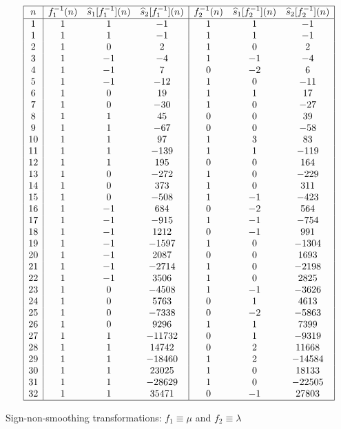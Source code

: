 \documentclass[12pt,reqno,a4letter]{article}
\numberwithin{figure}{section}
\numberwithin{table}{section}
\numberwithin{equation}{section}
\theoremstyle{plain}
\numberwithin{theorem}{section}
\theoremstyle{definition}
\begin{document}
\begin{table}[ht!]
\begin{equation*}
\begin{array}{|c|ccc|ccc|} 
 \hline
 n & f_1^{-1}(n) & \widehat{s}_1[f_1^{-1}](n) & \widehat{s}_2[f_1^{-1}](n) & 
     f_2^{-1}(n) & \widehat{s}_1[f_2^{-1}](n) & 
     \widehat{s}_2[f_2^{-1}](n) \\ \hline 1 & 1 & 1 & -1 & 1 & 1 & -1 \\
 1 & 1 & 1 & -1 & 1 & 1 & -1 \\
 2 & 1 & 0 & 2 & 1 & 0 & 2 \\
 3 & 1 & -1 & -4 & 1 & -1 & -4 \\
 4 & 1 & -1 & 7 & 0 & -2 & 6 \\
 5 & 1 & -1 & -12 & 1 & 0 & -11 \\
 6 & 1 & 0 & 19 & 1 & 1 & 17 \\
 7 & 1 & 0 & -30 & 1 & 0 & -27 \\
 8 & 1 & 1 & 45 & 0 & 0 & 39 \\
 9 & 1 & 1 & -67 & 0 & 0 & -58 \\
 10 & 1 & 1 & 97 & 1 & 3 & 83 \\
 11 & 1 & 1 & -139 & 1 & 1 & -119 \\
 12 & 1 & 1 & 195 & 0 & 0 & 164 \\
 13 & 1 & 0 & -272 & 1 & 0 & -229 \\
 14 & 1 & 0 & 373 & 1 & 0 & 311 \\
 15 & 1 & 0 & -508 & 1 & -1 & -423 \\
 16 & 1 & -1 & 684 & 0 & -2 & 564 \\
 17 & 1 & -1 & -915 & 1 & -1 & -754 \\
 18 & 1 & -1 & 1212 & 0 & -1 & 991 \\
 19 & 1 & -1 & -1597 & 1 & 0 & -1304 \\
 20 & 1 & -1 & 2087 & 0 & 0 & 1693 \\
 21 & 1 & -1 & -2714 & 1 & 0 & -2198 \\
 22 & 1 & -1 & 3506 & 1 & 0 & 2825 \\
 23 & 1 & 0 & -4508 & 1 & -1 & -3626 \\
 24 & 1 & 0 & 5763 & 0 & 1 & 4613 \\
 25 & 1 & 0 & -7338 & 0 & -2 & -5863 \\
 26 & 1 & 0 & 9296 & 1 & 1 & 7399 \\
 27 & 1 & 1 & -11732 & 0 & 1 & -9319 \\
 28 & 1 & 1 & 14742 & 0 & 2 & 11668 \\
 29 & 1 & 1 & -18460 & 1 & 2 & -14584 \\
 30 & 1 & 1 & 23025 & 1 & 0 & 18133 \\
 31 & 1 & 1 & -28629 & 1 & 0 & -22505 \\
 32 & 1 & 1 & 35471 & 0 & -1 & 27803 \\
 \hline
\end{array}
\end{equation*}
\caption{Sign-non-smoothing transformations: $f_1 \equiv \mu$ and $f_2 \equiv \lambda$}
\label{table_s12Hatfn_SignSmoothingTF_v5}
\end{table}

\label{page_LastPageOfDocumentMainMatterCount}
\end{document}
